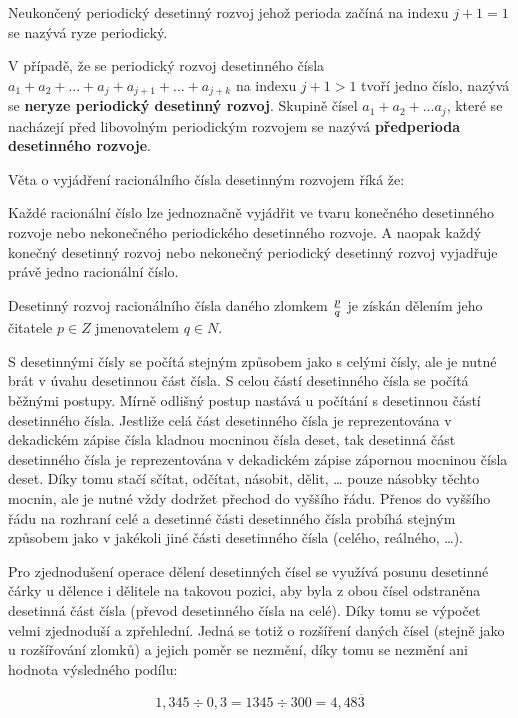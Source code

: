 Neukončený periodický desetinný rozvoj jehož perioda začíná na indexu $j+1=1$ se nazývá ryze periodický.

V případě, že se periodický rozvoj desetinného čísla $ a_1 + a_2 + ... + a_j + a_{j+1} + ...+ a_{j+k} $ na indexu $j+1 > 1$ tvoří jedno číslo, nazývá se {\bf neryze periodický desetinný rozvoj}. Skupině čísel $a_1 + a_2 + ... a_j$, které se nacházejí před libovolným periodickým rozvojem se nazývá {\bf předperioda desetinného rozvoje}.

Věta o vyjádření racionálního čísla desetinným rozvojem říká že:

Každé racionální číslo lze jednoznačně vyjádřit ve tvaru konečného desetinného rozvoje nebo nekonečného periodického desetinného rozvoje. A naopak každý konečný desetinný rozvoj nebo nekonečný periodický desetinný rozvoj vyjadřuje právě jedno racionální číslo.

Desetinný rozvoj racionálního čísla daného zlomkem $p \over q$ je získán dělením jeho čitatele $p \in Z$ jmenovatelem $ q \in N $.


S desetinnými čísly se počítá stejným způsobem jako s celými čísly, ale je nutné brát v úvahu desetinnou část čísla. S celou částí desetinného čísla se počítá běžnými postupy. Mírně odlišný postup nastává u počítání s desetinnou částí desetinného čísla. Jestliže celá část desetinného čísla je reprezentována v dekadickém zápise čísla kladnou mocninou čísla deset, tak desetinná část desetinného čísla je reprezentována v dekadickém zápise zápornou mocninou čísla deset. Díky tomu stačí sčítat, odčítat, násobit, dělit, … pouze násobky těchto mocnin, ale je nutné vždy dodržet přechod do vyššího řádu. Přenos do vyššího řádu na rozhraní celé a desetinné části desetinného čísla probíhá stejným způsobem jako v jakékoli jiné části desetinného čísla (celého, reálného, …).

Pro zjednodušení operace dělení desetinných čísel se využívá posunu desetinné čárky u dělence i dělitele na takovou pozici, aby byla z obou čísel odstraněna desetinná část čísla (převod desetinného čísla na celé). Díky tomu se výpočet velmi zjednoduší a zpřehlední. Jedná se totiž o rozšíření daných čísel (stejně jako u rozšířování zlomků) a jejich poměr se nezmění, díky tomu se nezmění ani hodnota výsledného podílu:

$$ 1,345 \div 0,3 = 1345 \div 300 = 4,48\overline{3} $$


